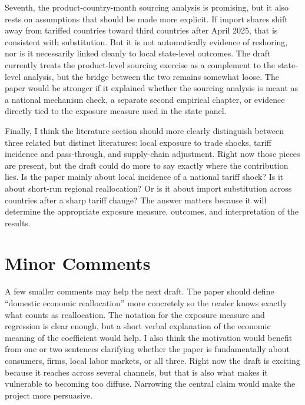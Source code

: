 \documentclass[12pt]{article}
\begin{document}
Seventh, the product-country-month sourcing analysis is promising, but it also rests on assumptions that should be made more explicit. If import shares shift away from tariffed countries toward third countries after April 2025, that is consistent with substitution. But it is not automatically evidence of reshoring, nor is it necessarily linked cleanly to local state-level outcomes. The draft currently treats the product-level sourcing exercise as a complement to the state-level analysis, but the bridge between the two remains somewhat loose. The paper would be stronger if it explained whether the sourcing analysis is meant as a national mechanism check, a separate second empirical chapter, or evidence directly tied to the exposure measure used in the state panel.

Finally, I think the literature section should more clearly distinguish between three related but distinct literatures: local exposure to trade shocks, tariff incidence and pass-through, and supply-chain adjustment. Right now those pieces are present, but the draft could do more to say exactly where the contribution lies. Is the paper mainly about local incidence of a national tariff shock? Is it about short-run regional reallocation? Or is it about import substitution across countries after a sharp tariff change? The answer matters because it will determine the appropriate exposure measure, outcomes, and interpretation of the results.


\section{Minor Comments}

A few smaller comments may help the next draft. The paper should define ``domestic economic reallocation'' more concretely so the reader knows exactly what counts as reallocation. The notation for the exposure measure and regression is clear enough, but a short verbal explanation of the economic meaning of the coefficient would help. I also think the motivation would benefit from one or two sentences clarifying whether the paper is fundamentally about consumers, firms, local labor markets, or all three. Right now the draft is exciting because it reaches across several channels, but that is also what makes it vulnerable to becoming too diffuse. Narrowing the central claim would make the project more persuasive.
\end{document}
